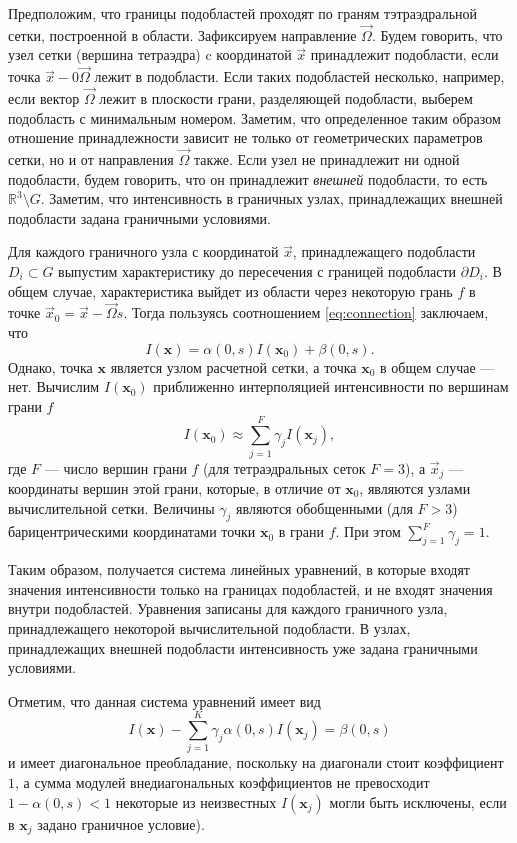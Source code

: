 Предположим, что границы подобластей проходят по граням тэтраэдральной сетки, построенной в области. Зафиксируем направление $\vec \Omega$. Будем говорить, что узел сетки (вершина тетраэдра) c координатой $\vec x$ принадлежит подобласти, если точка $\vec x - 0 \vec\Omega$ лежит в подобласти. Если таких подобластей несколько, например, если вектор $\vec \Omega$ лежит в плоскости грани, разделяющей подобласти, выберем подобласть с минимальным номером. Заметим, что определенное таким образом отношение принадлежности зависит не только от геометрических параметров сетки, но и от направления $\vec \Omega$ также. Если узел не принадлежит ни одной подобласти, будем говорить, что он принадлежит \emph{внешней} подобласти, то есть $\mathbb R^3 \setminus G$. Заметим, что интенсивность в граничных узлах, принадлежащих внешней подобласти задана граничными условиями.

Для каждого граничного узла с координатой $\vec x$, принадлежащего подобласти $D_i \subset G$ выпустим характеристику до пересечения с границей подобласти $\partial D_i$. В общем случае, характеристика выйдет из области через некоторую грань $f$ в точке $\vec x_0 = \vec x - \vec \Omega s$. 
Тогда пользуясь соотношением \eqref{eq:connection} заключаем, что
\[
I(\mathbf x) = \alpha(0, s) I(\mathbf x_0) + \beta(0, s).
\]
Однако, точка $\mathbf x$ является узлом расчетной сетки, а точка $\mathbf x_0$ в общем случае --- нет. Вычислим $I(\mathbf x_0)$ приближенно интерполяцией интенсивности по вершинам грани $f$
\[
I(\mathbf x_0) \approx \sum_{j=1}^F \gamma_j I(\mathbf x_j),
\]
где $F$ --- число вершин грани $f$ (для тетраэдральных сеток $F = 3$), а $\vec x_j$ --- координаты вершин этой грани, которые, в отличие от $\mathbf x_0$, являются узлами вычислительной сетки. Величины $\gamma_j$ являются обобщенными (для $F > 3$) барицентрическими координатами точки $\mathbf x_0$ в грани $f$. При этом $\sum_{j=1}^F \gamma_j = 1$.

Таким образом, получается система линейных уравнений, в которые входят значения интенсивности только на границах подобластей, и не входят значения внутри подобластей. Уравнения записаны для каждого граничного узла, принадлежащего некоторой вычислительной подобласти. В узлах, принадлежащих внешней подобласти интенсивность уже задана граничными условиями.

Отметим, что данная система уравнений имеет вид
\begin{equation}
I(\mathbf x) - \sum_{j=1}^K \gamma_j \alpha(0, s) I(\mathbf x_j) = \beta(0, s)
\label{eq:slae}
\end{equation}
и имеет диагональное преобладание, поскольку на диагонали стоит коэффициент $1$, а сумма модулей внедиагональных коэффициентов не превосходит $1 - \alpha(0, s) < 1$ некоторые из неизвестных $I(\mathbf x_j)$ могли быть исключены, если в $\mathbf x_j$ задано граничное условие).


